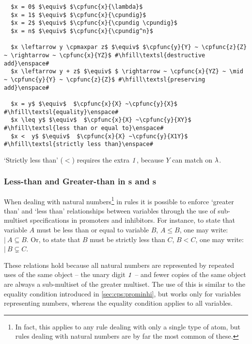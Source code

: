 \lstset{xleftmargin=.5in, xrightmargin=.5in} 
\begin{lstlisting}
  $x = 0$ $\equiv$ $\cpfunc{x}{\lambda}$
  $x = 1$ $\equiv$ $\cpfunc{x}{\cpundig}$
  $x = 2$ $\equiv$ $\cpfunc{x}{\cpundig \cpundig}$
  $x = n$ $\equiv$ $\cpfunc{x}{\cpundig^n}$
  
  $x \leftarrow y \cpmaxpar z$ $\equiv$ $\cpfunc{y}{Y} ~ \cpfunc{z}{Z} ~ \rightarrow ~ \cpfunc{x}{YZ}$ #\hfill\textsl{destructive add}\enspace#
  $x \leftarrow y + z$ $\equiv$ $ \rightarrow ~ \cpfunc{x}{YZ} ~ \mid ~ \cpfunc{y}{Y} ~ \cpfunc{z}{Z}$ #\hfill\textsl{preserving add}\enspace#
  
  $x = y$ $\equiv$  $\cpfunc{x}{X} ~\cpfunc{y}{X}$ #\hfill\textsl{equality}\enspace#
  $x \leq y$ $\equiv$  $\cpfunc{x}{X} ~\cpfunc{y}{XY}$ #\hfill\textsl{less than or equal to}\enspace#
  $x <  y$ $\equiv$  $\cpfunc{x}{X} ~\cpfunc{y}{X1Y}$ #\hfill\textsl{strictly less than}\enspace#
\end{lstlisting}
\noindent
`Strictly less than' (\(<\)) requires the extra \(\mathit{1}\), because \(Y\) can match on \(\lambda\).

\subsubsection{Less-than and Greater-than in s and s}

When dealing with natural numbers\footnote{In fact, this applies to any rule dealing with only a single type of atom, but rules dealing with natural numbers are by far the most common of these.} in rules it is possible to enforce `greater than' and `less than' relationships between variables through the use of sub-multiset specifications in \glspl{promoter} and \glspl{inhibitor}.  For instance, to state that variable \(A\) must be less than or equal to variable \(B\), \ie{} \(A \leq B\), one may write: \(|~ A \subseteq B\).  Or, to state that \(B\) must be strictly less than \(C\), \ie{} \(B < C\), one may write: \(|~ B \subsetneq C\).

These relations hold because all natural numbers are represented by repeated uses of the same object -- the unary digit \(\mathit{1}\) -- and fewer copies of the same object are always a sub-multiset of the greater multiset.  The use of this is similar to the equality condition introduced in \cref{sec:cps:prominhi}, but works only for variables representing numbers, whereas the equality condition applies to all variables. 

